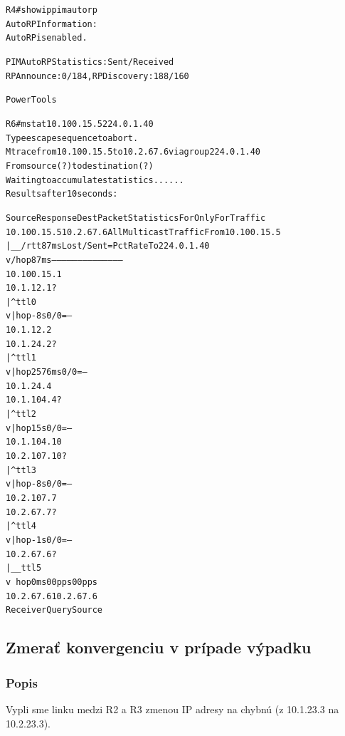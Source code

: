 \documentclass[12pt,twoside,a4paper]{report}
\begin{document}
\noindent
{\selectfont
\begin{small}
\begin{alltt}
R4#show ip pim autorp
AutoRP Information:
  AutoRP is enabled.

PIM AutoRP Statistics: Sent/Received
  RP Announce: 0/184, RP Discovery: 188/160






Power Tools

R6#mstat 10.100.15.5 224.0.1.40
Type escape sequence to abort.
Mtrace from 10.100.15.5 to 10.2.67.6 via group 224.0.1.40
From source (?) to destination (?)
Waiting to accumulate statistics......
Results after 10 seconds:

  Source        Response Dest   Packet Statistics For     Only For Traffic
10.100.15.5     10.2.67.6       All Multicast Traffic     From 10.100.15.5
     |       __/  rtt 87   ms   Lost/Sent = Pct  Rate     To 224.0.1.40
     v      /     hop 87   ms   ---------------------     --------------------
10.100.15.1
10.1.12.1       ?
     |     ^      ttl   0
     v     |      hop -8   s     0/0 = --%
10.1.12.2
10.1.24.2       ?
     |     ^      ttl   1
     v     |      hop 2576 ms    0/0 = --%
10.1.24.4
10.1.104.4      ?
     |     ^      ttl   2
     v     |      hop 15   s     0/0 = --%
10.1.104.10
10.2.107.10     ?
     |     ^      ttl   3
     v     |      hop -8   s     0/0 = --%
10.2.107.7
10.2.67.7       ?
     |     ^      ttl   4
     v     |      hop -1   s     0/0 = --%
10.2.67.6       ?
     |      \__   ttl   5
     v         \  hop 0    ms        0         0 pps           0    0 pps
10.2.67.6       10.2.67.6
  Receiver      Query Source

\end{alltt}
\end{small}
}


\subsection{Zmerať konvergenciu v prípade výpadku}
\subsubsection{Popis}
Vypli sme linku medzi R2 a R3 zmenou IP adresy na chybnú (z 10.1.23.3 na 10.2.23.3).
\end{document}
